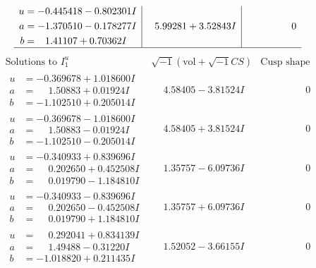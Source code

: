 \documentclass[1p]{elsarticle_modified}
\theoremstyle{definition}
\newcommand{\I}{\sqrt{-1}}
\begin{document}
$$\begin{array}{c|c|c}
\begin{aligned}
u &= -0.445418 - 0.802301 I \\
a &= -1.370510 - 0.178277 I \\
b &= \phantom{-}1.41107 + 0.70362 I\end{aligned}
 & \phantom{-}5.99281 + 3.52843 I & \phantom{-0.000000 } 0\\
 \hline 
 \end{array}$$\newpage$$\begin{array}{c|c|c}  
\text{Solutions to }I^u_{1}& \I (\text{vol} + \sqrt{-1}CS) & \text{Cusp shape}\\
 \hline 
\begin{aligned}
u &= -0.369678 + 1.018600 I \\
a &= \phantom{-}1.50883 + 0.01924 I \\
b &= -1.102510 + 0.205014 I\end{aligned}
 & \phantom{-}4.58405 - 3.81524 I & \phantom{-0.000000 } 0 \\ \hline\begin{aligned}
u &= -0.369678 - 1.018600 I \\
a &= \phantom{-}1.50883 - 0.01924 I \\
b &= -1.102510 - 0.205014 I\end{aligned}
 & \phantom{-}4.58405 + 3.81524 I & \phantom{-0.000000 } 0 \\ \hline\begin{aligned}
u &= -0.340933 + 0.839696 I \\
a &= \phantom{-}0.202650 + 0.452508 I \\
b &= \phantom{-}0.019790 - 1.184810 I\end{aligned}
 & \phantom{-}1.35757 - 6.09736 I & \phantom{-0.000000 } 0 \\ \hline\begin{aligned}
u &= -0.340933 - 0.839696 I \\
a &= \phantom{-}0.202650 - 0.452508 I \\
b &= \phantom{-}0.019790 + 1.184810 I\end{aligned}
 & \phantom{-}1.35757 + 6.09736 I & \phantom{-0.000000 } 0 \\ \hline\begin{aligned}
u &= \phantom{-}0.292041 + 0.834139 I \\
a &= \phantom{-}1.49488 - 0.31220 I \\
b &= -1.018820 + 0.211435 I\end{aligned}
 & \phantom{-}1.52052 - 3.66155 I & \phantom{-0.000000 } 0 \\ \hline\begin{aligned}

\end{aligned}
\end{array}$$
\end{document}
